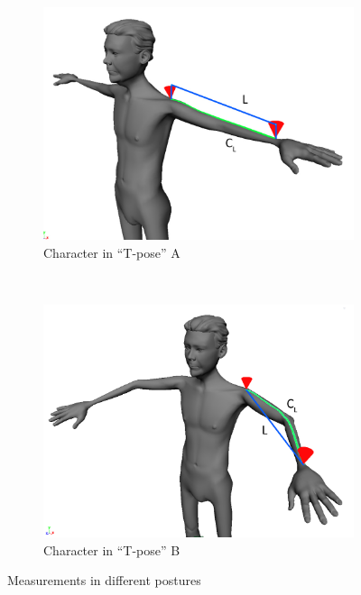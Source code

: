 \begin{figure}
        \centering
        \begin{subfigure}[b]{0.5\textwidth}
                \includegraphics[width=\textwidth]{../images/geodesic_image/straight_arm_posture}
                \caption{Character in ``T-pose'' A }
                \label{fig:tposeA}
        \end{subfigure}%
        ~
        \begin{subfigure}[b]{0.5\textwidth}
                \includegraphics[width=\textwidth]{../images/geodesic_image/bend_arm_posture}
                \caption{Character in ``T-pose'' B}
                \label{fig:tposeB}
        \end{subfigure}   
        \caption{Measurements in different postures}
        \label{fig:measurementAndPosture}       
\end{figure}



